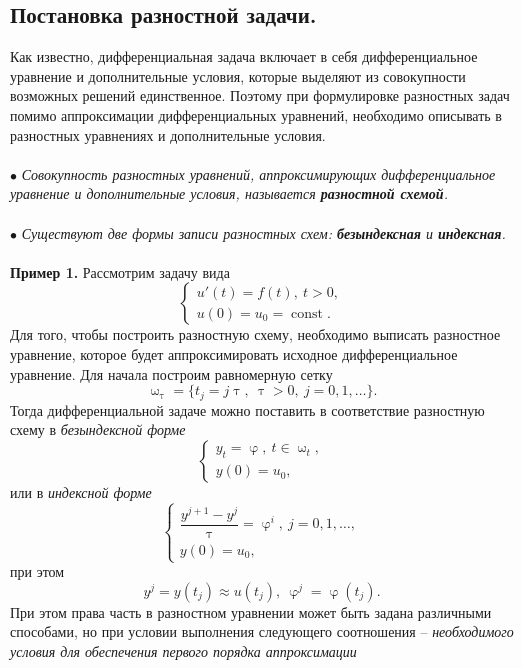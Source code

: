 \documentclass[a4paper, 12pt]{report}
\numberwithin{equation}{section}
\renewcommand{\varphi}{\upvarphi}
\renewcommand{\tau}{\uptau}
\renewcommand{\omega}{\upomega}
\newcommand{\const}{\operatorname{const}}
\begin{document}
		\subsection{Постановка разностной задачи.}
		Как известно, дифференциальная задача включает в себя дифференциальное уравнение и дополнительные условия, которые выделяют из совокупности возможных решений единственное. Поэтому при формулировке разностных задач помимо аппроксимации дифференциальных уравнений, необходимо описывать в разностных уравнениях и дополнительные условия.\\\\
		$\bullet$ \textit{Совокупность разностных уравнений, аппроксимирующих дифференциальное уравнение и дополнительные условия, называется \textbf{разностной схемой}.}\\\\
		$\bullet$ \textit{Существуют две формы записи разностных схем: \textbf{безындексная} и \textbf{индексная}.}\\\\
		\textbf{Пример 1.} Рассмотрим задачу вида 
		\begin{equation}
			\begin{cases}
			u'(t) = f(t),\ t>0,\\
		u(0) = u_0 = \const.
		\end{cases}
		\end{equation}
		Для того, чтобы построить разностную схему, необходимо выписать разностное уравнение, которое будет аппроксимировать исходное дифференциальное уравнение. Для начала построим равномерную сетку $$\omega_\tau = \{t_j = j\tau,\ \tau>0,\ j=0,1,\ldots\}.$$
		Тогда дифференциальной задаче можно поставить в соответствие разностную схему в \textit{безындексной форме}
		\begin{equation}
			\begin{cases}
			y_t = \varphi,\ t \in \omega _t,\\
			y(0) = u_0,
		\end{cases}
		\end{equation}
		или в \textit{индексной форме}
		\begin{equation}
			\begin{cases}
				\dfrac{y^{j+1}-y^j}{\tau} = \varphi^i,\ j=0,1,\ldots,\\
				y(0) = u_0,
			\end{cases}
		\end{equation}
		при этом $$y^j = y(t_j)\approx u(t_j),\ \varphi^j = \varphi(t_j).$$
		При этом права часть в разностном уравнении может быть задана различными способами, но при условии выполнения следующего соотношения -- \textit{необходимого условия для обеспечения первого порядка аппроксимации}
\end{document}
